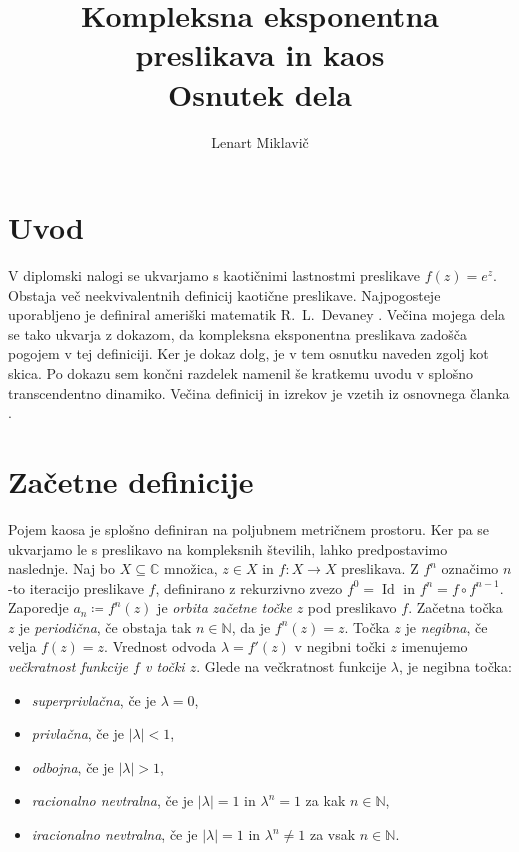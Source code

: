 \documentclass[a4paper, oneside]{amsart}
\title[Kompleksna eksponentna preslikava in kaos]
{Kompleksna eksponentna preslikava in kaos\\Osnutek dela}
\author{Lenart Miklavič}
\date{}
\newcommand{\NN}{\mathbb{N}}
\newcommand{\CC}{\mathbb{C}}
\DeclareMathOperator{\Id}{Id}
\theoremstyle{plain}
\theoremstyle{definition}
\begin{document}
\maketitle

\section{Uvod}
\noindent V diplomski nalogi se ukvarjamo s kaotičnimi lastnostmi preslikave
\(f (z) = e^z\). Obstaja več neekvivalentnih definicij kaotične preslikave.
Najpogosteje uporabljeno je definiral ameriški matematik R.~L.~Devaney
\cite{devaney1989}. Večina mojega dela se tako ukvarja z dokazom, da kompleksna
eksponentna preslikava zadošča pogojem v tej definiciji. Ker je dokaz dolg,
je v tem osnutku naveden zgolj kot skica. Po dokazu sem končni razdelek namenil 
še kratkemu uvodu v splošno transcendentno dinamiko. Večina definicij in izrekov
je vzetih iz osnovnega članka \cite{shen01122015}.

\section{Začetne definicije}
\noindent Pojem kaosa je splošno definiran na poljubnem metričnem prostoru. Ker
pa se ukvarjamo le s preslikavo na kompleksnih številih, lahko predpostavimo
naslednje. Naj bo \(X \subseteq \CC\) množica, \(z \in X\) in  \(f \colon X \to X\)
preslikava. Z \(f^{n}\) označimo \(n\)-to iteracijo preslikave \(f\), definirano
z rekurzivno zvezo \(f^{0} = \Id\) in \(f^{n} = f \circ f^{n - 1}\). Zaporedje
\(a_n \coloneq f^n (z)\) je \emph{orbita} \emph{začetne točke} \(z\) pod
preslikavo \(f\). Začetna točka \(z\) je \emph{periodična}, če obstaja tak
\(n \in \NN\), da je \(f^n (z) = z\). Točka \(z\) je \emph{negibna}, če velja
\(f (z) = z\). Vrednost odvoda \(\lambda = f' (z)\) v negibni točki \(z\)
imenujemo \emph{večkratnost funkcije \(f\) v točki \(z\)}. Glede na večkratnost
funkcije \(\lambda\), je negibna točka:
\begin{itemize}
    \item \emph{superprivlačna}, če je \(\lambda = 0\),
    \item \emph{privlačna}, če je \(|\lambda| < 1\),
    \item \emph{odbojna}, če je \(|\lambda| > 1\),
    \item \emph{racionalno nevtralna}, če je \(|\lambda| = 1\) in
        \(\lambda^n = 1\) za kak \(n \in \NN\),
    \item \emph{iracionalno nevtralna}, če je \(|\lambda| = 1\) in
        \(\lambda^n \neq 1\) za vsak \(n \in \NN\).
\end{itemize}
\end{document}
